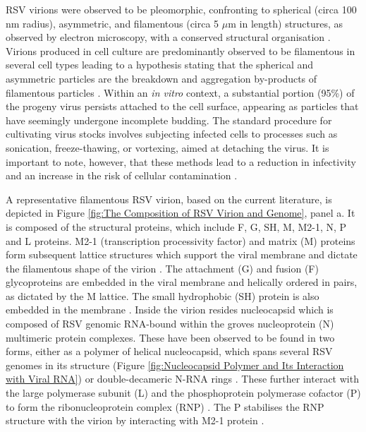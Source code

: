 RSV virions were observed to be pleomorphic, confronting to spherical (circa 100 nm radius), asymmetric, and filamentous (circa 5 \(\mu\)m in length) structures, as observed by electron microscopy, with a conserved structural organisation \cite{Kiss2014StructuralComplex}. Virions produced in cell culture are predominantly observed to be filamentous in several cell types leading to a hypothesis stating that the spherical and asymmetric particles are the breakdown and aggregation by-products of filamentous particles \cite{Ke2018TheTomography, Conley2022HelicalVirus}. Within an \textit{in vitro} context, a substantial portion (95\%) of the progeny virus persists attached to the cell surface, appearing as particles that have seemingly undergone incomplete budding. The standard procedure for cultivating virus stocks involves subjecting infected cells to processes such as sonication, freeze-thawing, or vortexing, aimed at detaching the virus. It is important to note, however, that these methods lead to a reduction in infectivity and an increase in the risk of cellular contamination \cite{Collins2013RespiratoryDisease}.

A representative filamentous RSV virion, based on the current literature, is depicted in Figure \ref{fig:The Composition of RSV Virion and Genome}, panel a. It is composed of the structural proteins, which include F, G, SH, M, M2-1, N, P and L proteins. M2-1 (transcription processivity factor) and matrix (M) proteins form subsequent lattice structures which support the viral membrane and dictate the filamentous shape of the virion \cite{Conley2022HelicalVirus}. The attachment (G) and fusion (F) glycoproteins are embedded in the viral membrane and helically ordered in pairs, as dictated by the M lattice. The small hydrophobic (SH) protein is also embedded in the membrane \cite{Ke2018TheTomography, Conley2022HelicalVirus}. Inside the virion resides nucleocapsid which is composed of RSV genomic RNA-bound within the groves nucleoprotein (N) multimeric protein complexes. These have been observed to be found in two forms, either as a polymer of helical nucleocapsid, which spans several RSV genomes in its structure (Figure \ref{fig:Nucleocapsid Polymer and Its Interaction with Viral RNA}) \cite{Tawar2009CrystalVirus, Conley2022HelicalVirus} or double-decameric N-RNA rings \cite{Gonnin2023StructuralNucleocapsids, Gonnin2022ImportanceVirus, Conley2022HelicalVirus}. These further interact with the large polymerase subunit (L) and the phosphoprotein polymerase cofactor (P) to form the ribonucleoprotein complex (RNP) \cite{Gonnin2023StructuralNucleocapsids}. The P stabilises the RNP structure with the virion by interacting with M2-1 protein \cite{Mason2003InteractionActivity}.

